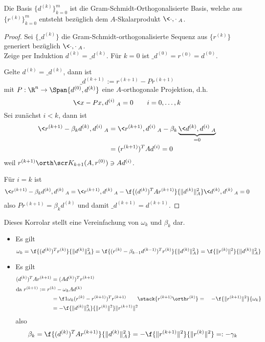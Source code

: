\documentclass[11pt]{scrbook}
\begin{document}
\begin{kor} \label{4.21}
	Die Basis $\{d^{(k)}\}_{k=0}^m$ ist die Gram-Schmidt-Orthogonalisierte Basis, welche aus $\{r^{(k)}\}_{k=0}^m$ entsteht bezüglich dem $A$-Skalarprodukt $\<\cdot,\cdot\>_A$.
	\begin{proof}
		Sei $\{\_d^{(k)}\}$ die Gram-Schmidt-orthogonalisierte Sequenz aus $\{r^{(k)}\}$ generiert bezüglich $\<\cdot,\cdot\>_A$. \\
		Zeige per Induktion $d^{(k)} = \_d^{(k)}$.
		Für $k=0$ ist $\_d^{(0)} = r^{(0)} = d^{(0)}$.

		Gelte  $d^{(k)} = \_d^{(k)}$, dann ist
		\[
			\_d^{(k+1)} := r^{(k+1)} - Pr^{(k+1)}
		\]
		mit $P : \R^n \to \Span\{d^{(0)}, d^{(k)}\}$ eine $A$-orthogonale Projektion, d.h.
		\[
			\<x-Px, d^{(i)}\>_A = 0
			\qquad i = 0, \dotsc, k
		\]
		Sei zunächst $i<k$, dann ist
		\begin{align*}
			\< r^{(k+1)} - \beta_k d^{(k)}, d^{(i)} \>_A
			&= \< r^{(k+1)}, d^{(i)} \>_A - \beta_k \underbrace{\<d^{(k)}, d^{(i)} \>_A}_{=0} \\
			&= (r^{(k+1)})^T A d^{(i)}
			= 0
		\end{align*}
		weil $r^{(k+1)} \orth \scr K_{k+1} (A, r^{(0)}) \ni Ad^{(i)}$.

		Für $i = k$ ist
		\begin{align*}
			\<r^{(k+1)} - \beta_k d^{(k)}, d^{(k)}\>_A
			= \< r^{(k+1)}, d^{(k)}\>_A - \f{(d^{(k)})^T A r^{(k+1)}}{\|d^{(k)}\|_A^2} \<d^{(k)},d^{(k)}\>_A
			= 0
		\end{align*}
		also $P r^{(k+1)} = \beta_k d^{(k)}$ und damit $\_d^{(k+1)} = d^{(k+1)}$.
	\end{proof}
	\begin{note}
		Dieses Korrolar stellt eine Vereinfachung von $\omega_k$ und $\beta_k$ dar.
		\begin{itemize}
			\item
				Es gilt
				\[
					\omega_k = \f {(d^{(k)})^T r^{(k)}}{\|d^{(k)}\|_A^2} = \f {(r^{(k)}-\beta_{k-1}d^{(k-1)})^T r^{(k)}}{\|d^{(k)}\|_A^2} = \f{\|r^{(k)}\|^2}{\|d^{(k)}\|_A^2}
				\]
			\item
				Es gilt
				\begin{align*}
					(d^{(k)})^T A r^{(k+1)}
					&= (A d^{(k)})^T r^{(k+1)} \\
					\intertext{da $r^{(k+1)} := r^{(k)}-\omega_k A d^{(k)}$}
					&= \f 1{\omega_k} (r^{(k)} - r^{(k+1)})^T r^{(k+1)} \qquad \stack{r^{(k+1)} \orth r^{(k)}} = \quad  - \f {\|r^{(k+1)}\|^2}{\omega_k} \\
					&= - \f {\|d^{(k)}\|_A^2}{\|r^{(k)}\|^2} \|r^{(k+1)}\|^2
				\end{align*}
				also
				\[
					\beta_k = \f{(d^{(k)})^T A r^{(k+1)}}{\|d^{(k)}\|_A^2} = - \f{\|r^{(k+1)}\|^2}{\|r^{(k)}\|^2} =: - \gamma_k
				\]
		\end{itemize}
	\end{note}
\end{kor}
\end{document}
